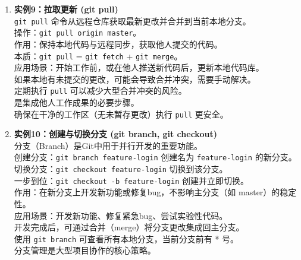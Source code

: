 \documentclass[a4paper, 12pt]{article}
\begin{document}
\begin{enumerate}
    \item \begin{tcolorbox}[instancestyle]
        \textbf{实例9：拉取更新 (git pull)} \\
        \texttt{git pull} 命令从远程仓库获取最新更改并合并到当前本地分支。\\
        操作：\texttt{git pull origin master}。\\
        作用：保持本地代码与远程同步，获取他人提交的代码。\\
        本质：\texttt{git pull} = \texttt{git fetch} + \texttt{git merge}。\\
        应用场景：开始工作前，或在他人推送新代码后，更新本地代码库。\\
        如果本地有未提交的更改，可能会导致合并冲突，需要手动解决。\\
        定期执行 \texttt{pull} 可以减少大型合并冲突的风险。\\
        是集成他人工作成果的必要步骤。\\
        确保在干净的工作区（无未暂存更改）执行 \texttt{pull} 更安全。
    \end{tcolorbox}

    \item \begin{tcolorbox}[instancestyle]
        \textbf{实例10：创建与切换分支 (git branch, git checkout)} \\
        分支（Branch）是Git中用于并行开发的重要功能。\\
        创建分支：\texttt{git branch feature-login} 创建名为 \texttt{feature-login} 的新分支。\\
        切换分支：\texttt{git checkout feature-login} 切换到该分支。\\
        一步到位：\texttt{git checkout -b feature-login} 创建并立即切换。\\
        作用：在新分支上开发新功能或修复bug，不影响主分支（如 master）的稳定性。\\
        应用场景：开发新功能、修复紧急bug、尝试实验性代码。\\
        开发完成后，可通过合并（merge）将分支更改集成回主分支。\\
        使用 \texttt{git branch} 可查看所有本地分支，当前分支前有 * 号。\\
        分支管理是大型项目协作的核心策略。
    \end{tcolorbox}

    \newpage
    

\end{enumerate}
\end{document}
